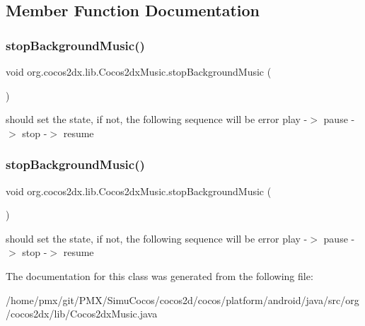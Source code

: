 \subsection{Member Function Documentation}
\mbox{\label{classorg_1_1cocos2dx_1_1lib_1_1Cocos2dxMusic_a0f376e36d6226ced411843f49c518d91}} 
\subsubsection{\texorpdfstring{stop\+Background\+Music()}{stopBackgroundMusic()}\hspace{0.1cm}{\footnotesize\ttfamily [1/2]}}
{\footnotesize\ttfamily void org.\+cocos2dx.\+lib.\+Cocos2dx\+Music.\+stop\+Background\+Music (\begin{DoxyParamCaption}{ }\end{DoxyParamCaption})\hspace{0.3cm}{\ttfamily [inline]}}

should set the state, if not, the following sequence will be error play -\/$>$ pause -\/$>$ stop -\/$>$ resume\mbox{\label{classorg_1_1cocos2dx_1_1lib_1_1Cocos2dxMusic_a0f376e36d6226ced411843f49c518d91}} 
\subsubsection{\texorpdfstring{stop\+Background\+Music()}{stopBackgroundMusic()}\hspace{0.1cm}{\footnotesize\ttfamily [2/2]}}
{\footnotesize\ttfamily void org.\+cocos2dx.\+lib.\+Cocos2dx\+Music.\+stop\+Background\+Music (\begin{DoxyParamCaption}{ }\end{DoxyParamCaption})\hspace{0.3cm}{\ttfamily [inline]}}

should set the state, if not, the following sequence will be error play -\/$>$ pause -\/$>$ stop -\/$>$ resume

The documentation for this class was generated from the following file\+:\begin{DoxyCompactItemize}
\item 
/home/pmx/git/\+P\+M\+X/\+Simu\+Cocos/cocos2d/cocos/platform/android/java/src/org/cocos2dx/lib/Cocos2dx\+Music.\+java\end{DoxyCompactItemize}
